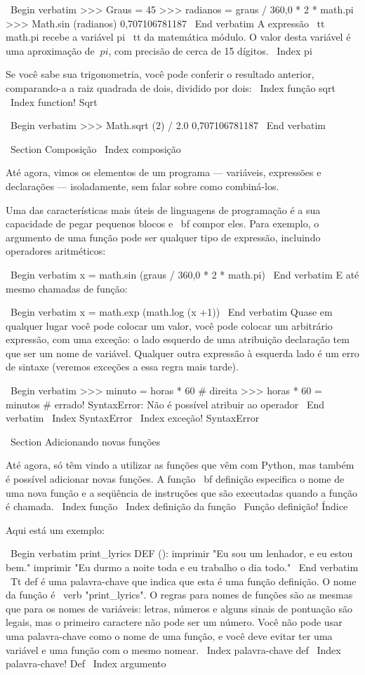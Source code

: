 \documentclass[10pt]{book}
\begin{document}
\begin {itemize}
{\ Begin {verbatim}
>>> Graus = 45
>>> radianos = graus / 360,0 * 2 * math.pi
>>> Math.sin (radianos)
0,707106781187
\ End {verbatim}
%
A expressão {\ tt math.pi} recebe a variável {pi \ tt} da matemática
módulo. O valor desta variável é uma aproximação
de $ \ pi $, com precisão de cerca de 15 dígitos.
\ Index {pi}

Se você sabe
sua trigonometria, você pode conferir o resultado anterior, comparando-a
a raiz quadrada de dois, dividido por dois:
\ Index {função sqrt}
\ Index {function! Sqrt}

\ Begin {verbatim}
>>> Math.sqrt (2) / 2.0
0,707106781187
\ End {verbatim}
%

\ Section {Composição}
\ Index {composição}

Até agora, vimos os elementos de um programa --- variáveis,
expressões e declarações --- isoladamente, sem falar sobre como
combiná-los.

Uma das características mais úteis de linguagens de programação é a sua
capacidade de pegar pequenos blocos e {\ bf compor} eles. Para
exemplo, o argumento de uma função pode ser qualquer tipo de expressão,
incluindo operadores aritméticos:

\ Begin {verbatim}
x = math.sin (graus / 360,0 * 2 * math.pi)
\ End {verbatim}
%
E até mesmo chamadas de função:

\ Begin {verbatim}
x = math.exp (math.log (x +1))
\ End {verbatim}
%
Quase em qualquer lugar você pode colocar um valor, você pode colocar um arbitrário
expressão, com uma exceção: o lado esquerdo de uma atribuição
declaração tem que ser um nome de variável. Qualquer outra expressão à esquerda
lado é um erro de sintaxe (veremos exceções a essa regra
mais tarde).

\ Begin {verbatim}
>>> minuto = horas * 60 # direita
>>> horas * 60 = minutos # errado!
SyntaxError: Não é possível atribuir ao operador
\ End {verbatim}
%
\ Index {} SyntaxError
\ Index {exceção! SyntaxError}


\ Section {Adicionando novas funções}

Até agora, só têm vindo a utilizar as funções que vêm com Python,
mas também é possível adicionar novas funções.
A função {\ bf definição} especifica o nome de uma nova função e
a seqüência de instruções que são executadas quando a função é chamada.
\ Index {função}
\ Index {definição da função}
\ {Função definição!} Índice

Aqui está um exemplo:

\ Begin {verbatim}
print_lyrics DEF ():
    imprimir "Eu sou um lenhador, e eu estou bem."
    imprimir "Eu durmo a noite toda e eu trabalho o dia todo."
\ End {verbatim}
%
{\ Tt def} é uma palavra-chave que indica que esta é uma função
definição. O nome da função é \ verb "print_lyrics". O
regras para nomes de funções são as mesmas que para os nomes de variáveis: letras,
números e alguns sinais de pontuação são legais, mas o primeiro caractere
não pode ser um número. Você não pode usar uma palavra-chave como o nome de uma função,
e você deve evitar ter uma variável e uma função com o mesmo
nomear.
\ Index {palavra-chave def}
\ Index {palavra-chave! Def}
\ Index {argumento}

}
\end{itemize}
\end{document}
